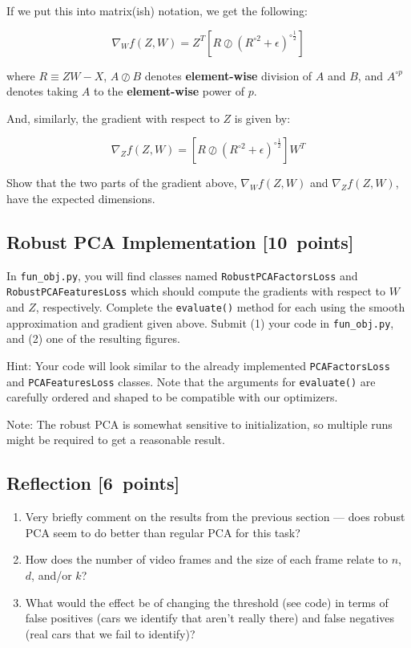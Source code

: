 \documentclass{article}
\newcommand{\blu}[1]{{\textcolor{blu}{#1}}}
\let\ask\blu
\newcommand\pts[1]{\textcolor{pointscolour}{[#1~points]}}
\begin{document}
If we put this into matrix(ish) notation, we get the following:

\[
\nabla_W f(Z,W) = Z^T \left[ R \oslash \left(R^{\circ 2} + \epsilon\right)^{\circ \frac12}  \right]
\]

where $R\equiv ZW-X$, $A \oslash B$ denotes \textbf{element-wise} division of $A$ and $B$, and $A^{\circ p}$ denotes taking $A$ to the \textbf{element-wise} power of $p$.

And, similarly, the gradient with respect to $Z$ is given by:

\[
\nabla_Z f(Z,W) = \left[ R \oslash \left(R^{\circ 2} + \epsilon\right)^{\circ \frac12} \right] W^T
\]

\ask{Show that the two parts of the gradient above, $\nabla_W f(Z,W)$ and $\nabla_Z f(Z,W)$, have the expected dimensions.}


\subsection{Robust PCA Implementation \pts{10}}

In \texttt{fun\_obj.py}, you will find classes named \texttt{RobustPCAFactorsLoss} and \texttt{RobustPCAFeaturesLoss} which should compute the gradients with respect to $W$ and $Z$, respectively. \ask{Complete the \texttt{evaluate()} method for each using the smooth approximation and gradient given above. Submit (1) your code in \texttt{fun\_obj.py}, and (2) one of the resulting figures.}

Hint: Your code will look similar to the already implemented \texttt{PCAFactorsLoss} and \texttt{PCAFeaturesLoss} classes. Note that the arguments for \texttt{evaluate()} are carefully ordered and shaped to be compatible with our optimizers.

Note: The robust PCA is somewhat sensitive to initialization, so multiple runs might be required to get a reasonable result.



\subsection{Reflection \pts{6}}

\begin{enumerate}
	\item Very briefly comment on the results from the previous section --- does robust PCA seem to do better than regular PCA for this task?
	\item How does the number of video frames and the size of each frame relate to $n$, $d$, and/or $k$?
	\item What would the effect be of changing the threshold (see code) in terms of false positives (cars we identify that aren't really there) and false negatives (real cars that we fail to identify)?
\end{enumerate}
\end{document}
